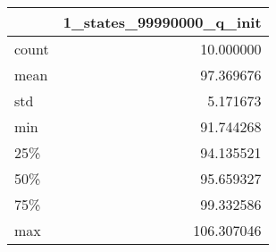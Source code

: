 \begin{tabular}{lr}
\toprule
{} &  1\_states\_99990000\_q\_init \\
\midrule
count &                 10.000000 \\
mean  &                 97.369676 \\
std   &                  5.171673 \\
min   &                 91.744268 \\
25\%   &                 94.135521 \\
50\%   &                 95.659327 \\
75\%   &                 99.332586 \\
max   &                106.307046 \\
\bottomrule
\end{tabular}
